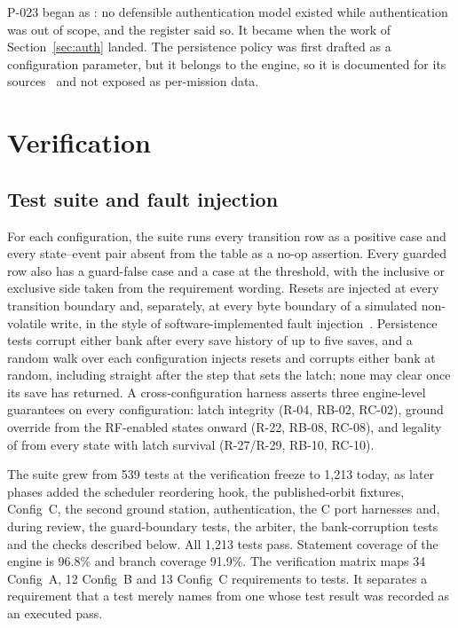 \documentclass[preprint,12pt]{elsarticle}
\newcommand{\cfgA}{Config~A}
\newcommand{\cfgB}{Config~B}
\newcommand{\cfgC}{Config~C}
\newcommand{\TestCount}{1,213}
\begin{document}
P-023 began as : no defensible authentication model existed while authentication was out of scope, and the register said so. It became  when the work of Section~\ref{sec:auth} landed. The persistence policy was first drafted as a configuration parameter, but it belongs to the engine, so it is documented for its sources~\cite{Murphy2022NEPP,Chen2006EEPROM} and not exposed as per-mission data.

\section{Verification}\label{sec:verification}

\subsection{Test suite and fault injection}

For each configuration, the suite runs every transition row as a positive case and every state--event pair absent from the table as a no-op assertion. Every guarded row also has a guard-false case and a case at the threshold, with the inclusive or exclusive side taken from the requirement wording. Resets are injected at every transition boundary and, separately, at every byte boundary of a simulated non-volatile write, in the style of software-implemented fault injection~\cite{Hsueh1997FaultInjection}. Persistence tests corrupt either bank after every save history of up to five saves, and a random walk over each configuration injects resets and corrupts either bank at random, including straight after the step that sets the latch; none may clear  once its save has returned. A cross-configuration harness asserts three engine-level guarantees on every configuration: latch integrity (R-04, RB-02, RC-02), ground override from the RF-enabled states onward (R-22, RB-08, RC-08), and legality of  from every state with latch survival (R-27/R-29, RB-10, RC-10).

The suite grew from 539 tests at the verification freeze to \TestCount{} today, as later phases added the scheduler reordering hook, the published-orbit fixtures, \cfgC{}, the second ground station, authentication, the C port harnesses and, during review, the guard-boundary tests, the arbiter, the bank-corruption tests and the checks described below. All \TestCount{} tests pass. Statement coverage of the engine is 96.8\% and branch coverage 91.9\%. The verification matrix maps 34 \cfgA{}, 12 \cfgB{} and 13 \cfgC{} requirements to tests. It separates a requirement that a test merely names from one whose test result was recorded as an executed pass.
\end{document}
